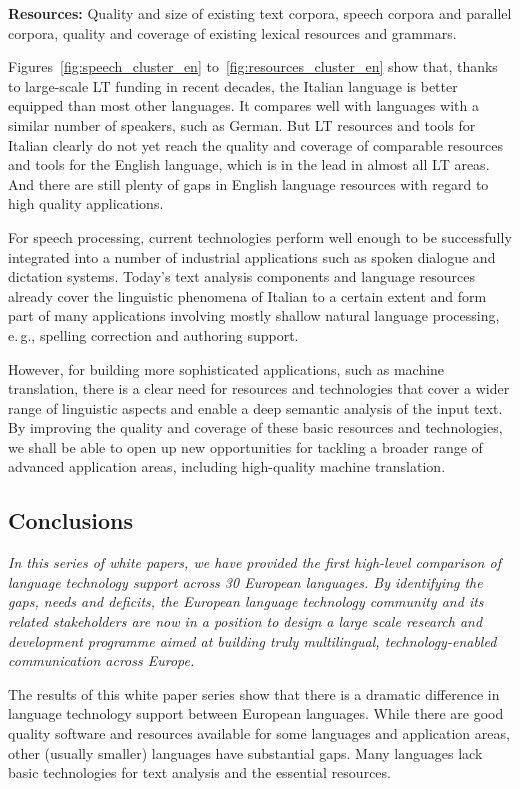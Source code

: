 \begin{multicols}{2}
\textbf{Resources:} Quality and size of existing text corpora, speech corpora and parallel corpora, quality and coverage of existing lexical resources and grammars.


Figures~\ref{fig:speech_cluster_en} to~\ref{fig:resources_cluster_en} show that, thanks to large-scale LT funding in recent decades, the Italian language is better equipped than most other languages. It compares well with languages with a similar number of speakers, such as German. But LT resources and tools for Italian clearly do not yet reach the quality and coverage of comparable resources and tools for the English language, which is in the lead in almost all LT areas. And there are still plenty of gaps in English language resources with regard to high quality applications.

For speech processing, current technologies perform well enough to be successfully integrated into a number of industrial applications such as spoken dialogue and dictation systems. Today's text analysis components and language resources already cover the linguistic phenomena of Italian to a certain extent and form part of many applications involving mostly shallow natural language processing, e.\,g., spelling correction and authoring support.

However, for building more sophisticated applications, such as machine translation, there is a clear need for resources and technologies that cover a wider range of linguistic aspects and enable a deep semantic analysis of the input text. By improving the quality and coverage of these basic resources and technologies, we shall be able to open up new opportunities for tackling a broader range of advanced application areas, including high-quality machine translation.


\subsection{Conclusions}


\emph{In this series of white papers, we have provided the first high-level comparison of language technology support across 30 European languages.
By identifying the gaps, needs and deficits, the European language technology community and its related stakeholders are now in a position to design a large scale research and development programme aimed at building truly multilingual, technology-enabled communication across Europe.}

The results of this white paper series show that there is a dramatic difference in language technology support between European languages. While there are good quality software and resources available for some languages and application areas, other (usually smaller) languages have substantial gaps. Many languages lack basic technologies for text analysis and the essential resources. 


\end{multicols}
